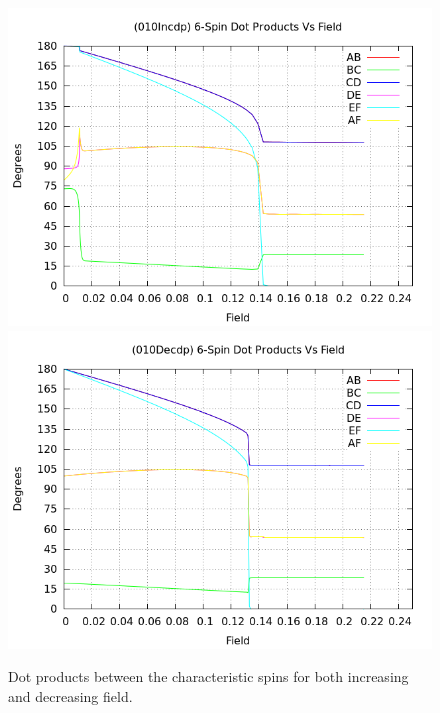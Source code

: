 \documentclass{article}
\begin{document}
\begin{center}
\begin{figure}
\centering
\includegraphics[scale=0.5]{HVariedData/Pictures/010Incdp.png}
\includegraphics[scale=0.5]{HVariedData/Pictures/010Decdp.png}
\caption{Dot products between the characteristic spins for both increasing and decreasing field.}
\end{figure}
\end{center}
\clearpage
\end{document}
